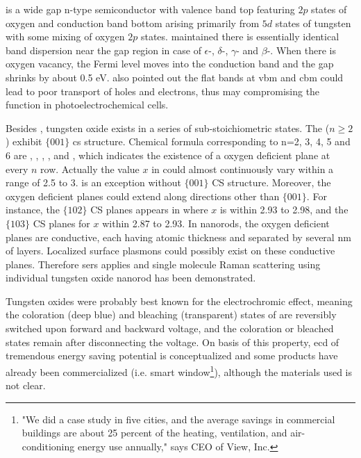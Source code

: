  is a wide gap n-type semiconductor with valence band top featuring $2p$ states of oxygen and conduction band bottom arising primarily from $5d$ states of tungsten with some mixing of oxygen $2p$ states.\cite{Gillet2004} \citeauthor{Migas2010a} maintained there is essentially identical band dispersion near the gap region in case of $\epsilon$-, $\delta$-, $\gamma$- and $\beta$-.\cite{Migas2010a} When there is oxygen vacancy, the Fermi level moves into the conduction band and the gap shrinks by about 0.5 eV. \citeauthor{Migas2010a} also pointed out the flat bands at \gls{vbm} and \gls{cbm} could lead to poor transport of holes and electrons, thus may compromising the function in photoelectrochemical cells.

Besides , tungsten oxide exists in a series of sub-stoichiometric states. The  ($n \geq 2$) exhibit $\{ 001 \}$ \gls{cs} structure. Chemical formula corresponding to n=2, 3, 4, 5 and 6 are , , , , and , which indicates the existence of a oxygen deficient plane at every $n$ row. Actually the value $x$ in  could almost continuously vary within a range of 2.5 to 3.  is an exception without $\{ 001 \}$ CS structure. Moreover, the oxygen deficient planes could extend along directions other than $\{ 001 \}$. For instance, the $\{ 102 \}$ CS planes appears in  where $x$ is within 2.93 to 2.98, and  the $\{ 103 \}$ CS planes for $x$ within 2.87 to 2.93.\cite{Sloan1999} In  nanorods, the oxygen deficient planes are conductive, each having atomic thickness and separated by several nm of  layers. Localized surface plasmons could possibly exist on these conductive planes. Therefore \gls{sers} applies and single molecule Raman scattering using individual tungsten oxide nanorod has been demonstrated.\cite{Shingaya2013}

Tungsten oxides were probably best known for the electrochromic effect, meaning the coloration (deep blue) and bleaching (transparent) states of  are reversibly switched upon forward and backward voltage, and the coloration or bleached states remain after disconnecting the voltage. On basis of this property, \gls{ecd} of tremendous energy saving potential is conceptualized and some products have already been commercialized (i.e. smart window\footnote{"We did a case study in five cities, and the average savings in commercial buildings are about 25 percent of the heating, ventilation, and air-conditioning energy use annually," says CEO of View, Inc.}), although the materials used is not clear. 

